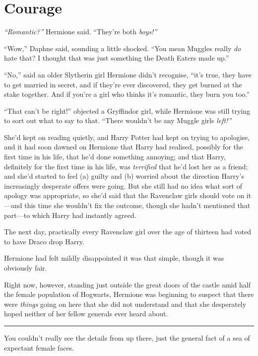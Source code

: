 \chapter{Courage}\label{courage}

\emph{``Romantic?''} Hermione said. ``They're both \emph{boys!''}

``Wow,'' Daphne said, sounding a little shocked. ``You mean Muggles
really \emph{do} hate that? I thought that was just something the Death
Eaters made up.''

``No,'' said an older Slytherin girl Hermione didn't recognise, ``it's
true, they have to get married in secret, and if they're ever
discovered, they get burned at the stake together. And if you're a girl
who thinks it's romantic, they burn you too.''

``That can't be right!'' objected a Gryffindor girl, while Hermione was
still trying to sort out what to say to that. ``There wouldn't be any
Muggle girls \emph{left!''}

She'd kept on reading quietly, and Harry Potter had kept on trying to
apologise, and it had soon dawned on Hermione that Harry had realised,
possibly for the first time in his life, that he'd done something
annoying; and that Harry, definitely for the first time in his life, was
\emph{terrified} that he'd lost her as a friend; and she'd started to
feel (a) guilty and (b) worried about the direction Harry's increasingly
desperate offers were going. But she still had no idea what sort of
apology was appropriate, so she'd said that the Ravenclaw girls should
vote on it---and this time she wouldn't fix the outcome, though she
hadn't mentioned that part---to which Harry had instantly agreed.

The next day, practically every Ravenclaw girl over the age of thirteen
had voted to have Draco drop Harry.

Hermione had felt mildly disappointed it was that simple, though it was
obviously fair.

Right now, however, standing just outside the great doors of the castle
amid half the female population of Hogwarts, Hermione was beginning to
suspect that there were \emph{things} going on here that she did not
understand and that she desperately hoped neither of her fellow generals
ever heard about.

\begin{center}\rule{3in}{0.4pt}\end{center}

You couldn't really see the details from up there, just the general fact
of a sea of expectant female faces.

